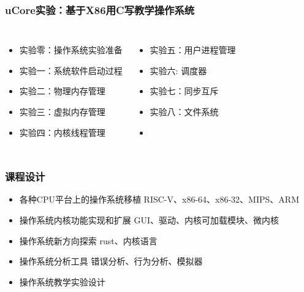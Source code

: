 \documentclass[UTF8]{ctexbeamer}
\begin{document}
\begin{frame}
\frametitle{uCore实验：基于X86用C写教学操作系统}
\begin{columns}
\begin{itemize}
		\item 实验零：操作系统实验准备
		\item 实验一：系统软件启动过程
		\item 实验二：物理内存管理
		\item 实验三：虚拟内存管理
		\item 实验四：内核线程管理
\end{itemize}
 
    \begin{itemize}
		\item 实验五：用户进程管理
		\item 实验六: 调度器
		\item 实验七：同步互斥
		\item 实验八：文件系统
		\item 
	\end{itemize}
\end{columns}

\end{frame}

\begin{frame}
    \frametitle{课程设计}
    \begin{itemize}
        \item 各种CPU平台上的操作系统移植
        \subitem RISC-V、x86-64、x86-32、MIPS、ARM
        \item 操作系统内核功能实现和扩展
        \subitem GUI、驱动、内核可加载模块、微内核
        \item 操作系统新方向探索
        \subitem rust、内核语言
        \item 操作系统分析工具
        \subitem 错误分析、行为分析、模拟器
        \item 操作系统教学实验设计
    \end{itemize}
\end{frame}
\end{document}
